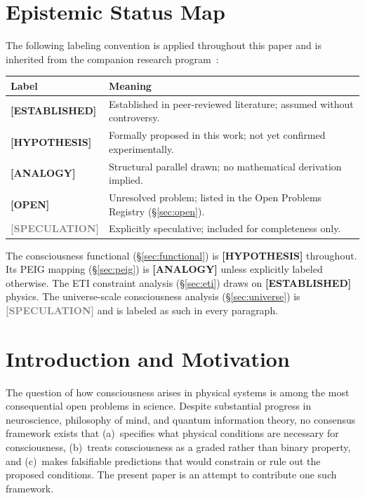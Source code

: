\documentclass[12pt,letterpaper]{article}
\newcommand{\ESTABLISHED}[1]{\textcolor{green!50!black}{\textbf{[ESTABLISHED]}} #1}
\newcommand{\HYPOTHESIS}[1]{\textcolor{blue!70!black}{\textbf{[HYPOTHESIS]}} #1}
\newcommand{\ANALOGY}[1]{\textcolor{orange!70!black}{\textbf{[ANALOGY]}} #1}
\newcommand{\OPEN}[1]{\textcolor{red!70!black}{\textbf{[OPEN]}} #1}
\newcommand{\SPECULATION}[1]{\textcolor{gray}{\textbf{[SPECULATION]}} #1}
\begin{document}
\section{Epistemic Status Map}
\label{sec:epistemic}

The following labeling convention is applied throughout this paper and is
inherited from the companion research program~\cite{Monette2026a,Monette2026b,Monette2026c}:

\begin{center}
\begin{tabular}{p{3.6cm} p{8.9cm}}
\toprule
\textbf{Label} & \textbf{Meaning} \\
\midrule
\ESTABLISHED{} & Established in peer-reviewed literature; assumed without controversy. \\
\HYPOTHESIS{} & Formally proposed in this work; not yet confirmed experimentally. \\
\ANALOGY{} & Structural parallel drawn; no mathematical derivation implied. \\
\OPEN{} & Unresolved problem; listed in the Open Problems Registry (\S\ref{sec:open}). \\
\SPECULATION{} & Explicitly speculative; included for completeness only. \\
\bottomrule
\end{tabular}
\end{center}

\medskip
\noindent The consciousness functional (\S\ref{sec:functional}) is
\HYPOTHESIS{} throughout. Its PEIG mapping (\S\ref{sec:peig}) is
\ANALOGY{} unless explicitly labeled otherwise. The ETI constraint analysis
(\S\ref{sec:eti}) draws on \ESTABLISHED{} physics. The universe-scale
consciousness analysis (\S\ref{sec:universe}) is \SPECULATION{} and is
labeled as such in every paragraph.

\section{Introduction and Motivation}
\label{sec:intro}

The question of how consciousness arises in physical systems is among the most
consequential open problems in science. Despite substantial progress in
neuroscience, philosophy of mind, and quantum information theory, no consensus
framework exists that (a)~specifies what physical conditions are necessary for
consciousness, (b)~treats consciousness as a graded rather than binary property,
and (c)~makes falsifiable predictions that would constrain or rule out the
proposed conditions. The present paper is an attempt to contribute one such
framework.
\end{document}
